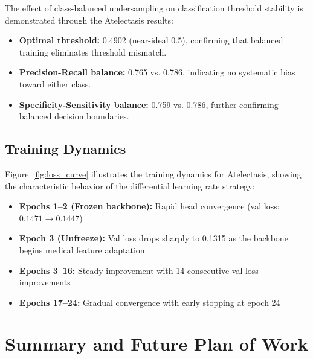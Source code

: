 \documentclass[12pt,a4paper]{report}
\begin{document}
The effect of class-balanced undersampling on classification threshold stability is demonstrated through the Atelectasis results:

\begin{itemize}
    \item \textbf{Optimal threshold:} 0.4902 (near-ideal 0.5), confirming that balanced training eliminates threshold mismatch.
    \item \textbf{Precision-Recall balance:} 0.765 vs. 0.786, indicating no systematic bias toward either class.
    \item \textbf{Specificity-Sensitivity balance:} 0.759 vs. 0.786, further confirming balanced decision boundaries.
\end{itemize}

\section{Training Dynamics}

Figure~\ref{fig:loss_curve} illustrates the training dynamics for Atelectasis, showing the characteristic behavior of the differential learning rate strategy:

\begin{itemize}
    \item \textbf{Epochs 1--2 (Frozen backbone):} Rapid head convergence (val loss: $0.1471 \rightarrow 0.1447$)
    \item \textbf{Epoch 3 (Unfreeze):} Val loss drops sharply to 0.1315 as the backbone begins medical feature adaptation
    \item \textbf{Epochs 3--16:} Steady improvement with 14 consecutive val loss improvements
    \item \textbf{Epochs 17--24:} Gradual convergence with early stopping at epoch 24
\end{itemize}



\chapter{Summary and Future Plan of Work}
\end{document}
